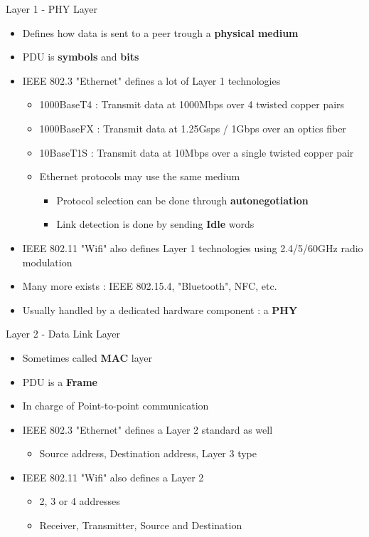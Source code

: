 \begin{frame}{Layer 1 - PHY Layer}
	\begin{itemize}
		\item Defines how data is sent to a peer trough a \textbf{physical medium}
		\item PDU is \textbf{symbols} and \textbf{bits}
		\item IEEE 802.3 "Ethernet" defines a lot of Layer 1 technologies
			\begin{itemize}
				\item 1000BaseT4 : Transmit data at 1000Mbps over 4 twisted copper pairs
				\item 1000BaseFX : Transmit data at 1.25Gsps / 1Gbps over an optics fiber
				\item 10BaseT1S : Transmit data at 10Mbps over a single twisted copper pair
				\item Ethernet protocols may use the same medium
					\begin{itemize}
						\item Protocol selection can be done through \textbf{autonegotiation}
						\item Link detection is done by sending \textbf{Idle} words
					\end{itemize}
			\end{itemize}
		\item IEEE 802.11 "Wifi" also defines Layer 1 technologies using 2.4/5/60GHz radio modulation
		\item Many more exists : IEEE 802.15.4, "Bluetooth", NFC, etc.
		\item Usually handled by a dedicated hardware component : a \textbf{PHY}
	\end{itemize}
\end{frame}

\begin{frame}{Layer 2 - Data Link Layer}
	\begin{itemize}
		\item Sometimes called \textbf{MAC} layer
		\item PDU is a \textbf{Frame}
		\item In charge of Point-to-point communication
		\item IEEE 802.3 "Ethernet" defines a Layer 2 standard as well
			\begin{itemize}
				\item Source address, Destination address, Layer 3 type
			\end{itemize}
		\item IEEE 802.11 "Wifi" also defines a Layer 2
			\begin{itemize}
				\item 2, 3 or 4 addresses
				\item Receiver, Transmitter, Source and Destination
			\end{itemize}

	\end{itemize}
\end{frame}

